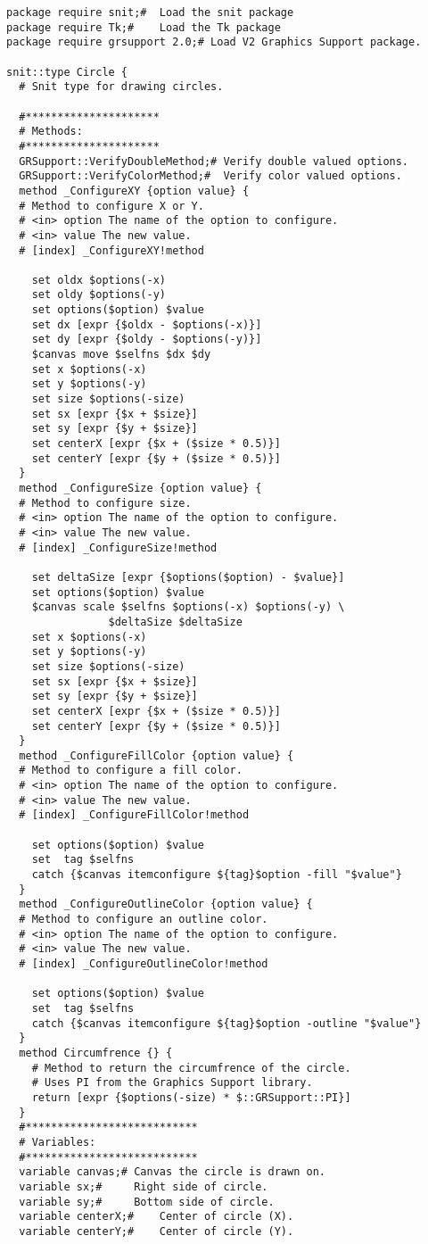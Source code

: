 \begin{lstlisting}[caption={Graphics Support package examples},
		   label={lst:GRS:Examples}]
package require snit;#	Load the snit package
package require Tk;#	Load the Tk package
package require grsupport 2.0;#	Load V2 Graphics Support package.

snit::type Circle {
  # Snit type for drawing circles.

  #*********************
  # Methods:
  #*********************
  GRSupport::VerifyDoubleMethod;# Verify double valued options.
  GRSupport::VerifyColorMethod;#  Verify color valued options.
  method _ConfigureXY {option value} {
  # Method to configure X or Y.
  # <in> option The name of the option to configure.
  # <in> value The new value.
  # [index] _ConfigureXY!method

    set oldx $options(-x)
    set oldy $options(-y)
    set options($option) $value
    set dx [expr {$oldx - $options(-x)}]
    set dy [expr {$oldy - $options(-y)}]
    $canvas move $selfns $dx $dy
    set x $options(-x)
    set y $options(-y)
    set size $options(-size)
    set sx [expr {$x + $size}]
    set sy [expr {$y + $size}]
    set centerX [expr {$x + ($size * 0.5)}]
    set centerY [expr {$y + ($size * 0.5)}]
  }
  method _ConfigureSize {option value} {
  # Method to configure size.
  # <in> option The name of the option to configure.
  # <in> value The new value.
  # [index] _ConfigureSize!method

    set deltaSize [expr {$options($option) - $value}]
    set options($option) $value
    $canvas scale $selfns $options(-x) $options(-y) \
				$deltaSize $deltaSize
    set x $options(-x)
    set y $options(-y)
    set size $options(-size)
    set sx [expr {$x + $size}]
    set sy [expr {$y + $size}]
    set centerX [expr {$x + ($size * 0.5)}]
    set centerY [expr {$y + ($size * 0.5)}]
  }
  method _ConfigureFillColor {option value} {
  # Method to configure a fill color.
  # <in> option The name of the option to configure.
  # <in> value The new value.
  # [index] _ConfigureFillColor!method

    set options($option) $value
    set  tag $selfns
    catch {$canvas itemconfigure ${tag}$option -fill "$value"}
  }
  method _ConfigureOutlineColor {option value} {
  # Method to configure an outline color.
  # <in> option The name of the option to configure.
  # <in> value The new value.
  # [index] _ConfigureOutlineColor!method

    set options($option) $value
    set  tag $selfns
    catch {$canvas itemconfigure ${tag}$option -outline "$value"}
  }
  method Circumfrence {} {
    # Method to return the circumfrence of the circle.
    # Uses PI from the Graphics Support library.
    return [expr {$options(-size) * $::GRSupport::PI}]
  }
  #***************************
  # Variables:
  #***************************
  variable canvas;#	Canvas the circle is drawn on.
  variable sx;#		Right side of circle.
  variable sy;#		Bottom side of circle.
  variable centerX;#	Center of circle (X).
  variable centerY;#	Center of circle (Y).


\end{lstlisting}
